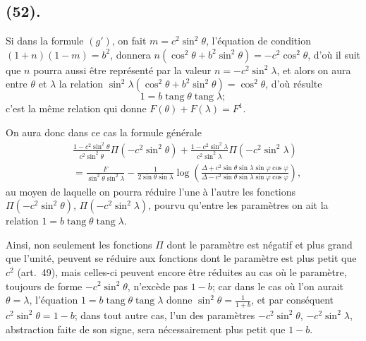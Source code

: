 \documentclass{article}
\begin{document}
\subsection*{(52).}

Si dans la formule $(g')$, on fait $m=c^{2}\sin^{2}\theta$, l'équation de condition $(1+n)(1-m)=b^{2}$, donnera $n(\cos^{2}\theta+b^{2}\sin^{2}\theta)=-c^{2}\cos^{2}\theta$, d'où il suit que $n$ pourra aussi être représenté par la valeur $n=-c^{2}\sin^{2}\lambda$, et alors on aura entre $\theta$ et $\lambda$ la relation $\sin^{2}\lambda(\cos^{2}\theta+b^{2}\sin^{2}\theta)=\cos^{2}\theta$, d'où résulte
\[ 1=b\operatorname{tang}\theta\operatorname{tang}\lambda; \]
c'est la même relation qui donne $F(\theta)+F(\lambda)=F^{1}$.

On aura donc dans ce cas la formule générale
\[ \begin{aligned} &\frac{1-c^{2}\sin^{2}\theta}{c^{2}\sin^{2}\theta}\Pi(-c^{2}\sin^{2}\theta)+\frac{1-c^{2}\sin^{2}\lambda}{c^{2}\sin^{2}\lambda}\Pi(-c^{2}\sin^{2}\lambda)\\ &=\frac{F}{\sin^{2}\theta\sin^{2}\lambda}-\frac{1}{2\sin\theta\sin\lambda}\log\left(\frac{\Delta+c^{2}\sin\theta\sin\lambda\sin\varphi\cos\varphi}{\Delta-c^{2}\sin\theta\sin\lambda\sin\varphi\cos\varphi}\right), \end{aligned} \]
au moyen de laquelle on pourra réduire l'une à l'autre les fonctions $\Pi(-c^{2}\sin^{2}\theta)$, $\Pi(-c^{2}\sin^{2}\lambda)$, pourvu qu'entre les paramètres on ait la relation $1=b\operatorname{tang}\theta\operatorname{tang}\lambda$.

Ainsi, non seulement les fonctions $\Pi$ dont le paramètre est négatif et plus grand que l'unité, peuvent se réduire aux fonctions dont le paramètre est plus petit que $c^{2}$ (art.\ 49), mais celles-ci peuvent encore être réduites au cas où le paramètre, toujours de forme $-c^{2}\sin^{2}\theta$, n'excède pas $1-b$; car dans le cas où l'on aurait $\theta=\lambda$, l'équation $1=b\operatorname{tang}\theta\operatorname{tang}\lambda$ donne $\sin^{2}\theta=\frac{1}{1+b}$, et par conséquent $c^{2}\sin^{2}\theta=1-b$; dans tout autre cas, l'un des paramètres $-c^{2}\sin^{2}\theta$, $-c^{2}\sin^{2}\lambda$, abstraction faite de son signe, sera nécessairement plus petit que $1-b$.
\end{document}
